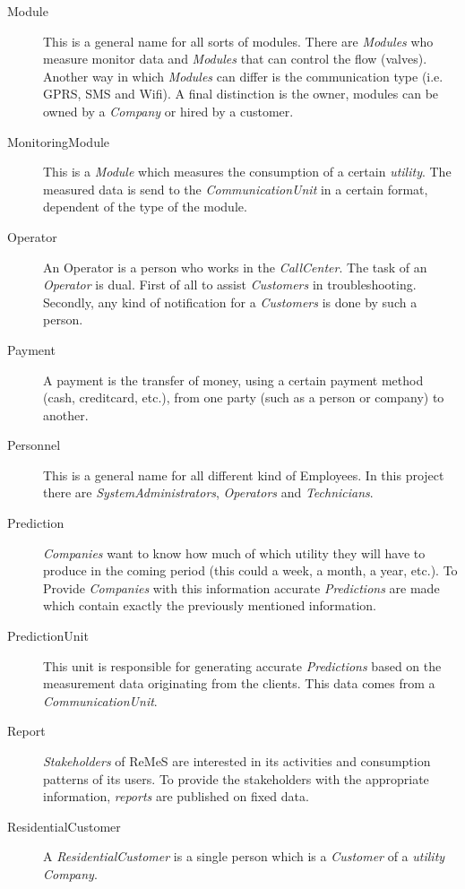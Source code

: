 \begin{description}
\item[Module] This is a general name for all sorts of modules.
There are \emph{Modules} who measure monitor data and \emph{Modules} that can
control the flow (valves). Another way in which \emph{Modules} can differ is the
communication type (i.e. GPRS, SMS and Wifi). A final distinction is the owner,
modules can be owned by a \emph{Company} or hired by a customer.

\item[MonitoringModule] This is a \emph{Module} which measures the consumption
of a certain \emph{utility}. The measured data is send to the
\emph{CommunicationUnit} in a certain format, dependent of the type of the
module.

\item[Operator] An Operator is a person who works in the \emph{CallCenter}. The
task of an \emph{Operator} is dual. First of all to assist \emph{Customers} in
troubleshooting. Secondly, any kind of notification for a \emph{Customers} is
done by such a person.

\item[Payment] A payment is the transfer of money, using a certain payment
method (cash, creditcard, etc.), from one party (such as a person or company) to
another.

\item[Personnel] This is a general name for all different kind of Employees. In
this project there are \emph{SystemAdministrators}, \emph{Operators} and
\emph{Technicians}.

\item[Prediction] \emph{Companies} want to know how much of which utility they
will have to produce in the coming period (this could a week, a month, a year,
etc.). To Provide \emph{Companies} with this information accurate
\emph{Predictions} are made which contain exactly the previously mentioned
information.

\item[PredictionUnit] This unit is responsible for generating accurate
\emph{Predictions} based on the measurement data originating from the clients.
This data comes from a \emph{CommunicationUnit}.

\item[Report] \emph{Stakeholders} of ReMeS are interested in its activities and
consumption patterns of its users. To provide the stakeholders with the
appropriate information, \emph{reports} are published on fixed data.

\item[ResidentialCustomer] A \emph{ResidentialCustomer} is a single person which
is a \emph{Customer} of a \emph{utility} \emph{Company}. 


\end{description}
